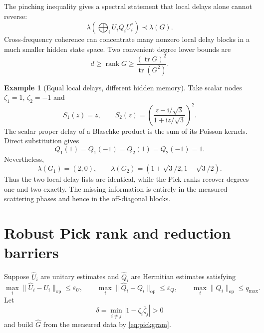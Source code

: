 \documentclass[11pt]{article}
\theoremstyle{definition}
\newtheorem{example}[theorem]{Example}
\theoremstyle{remark}
\newcommand{\tr}{\operatorname{tr}}
\newcommand{\rank}{\operatorname{rank}}
\newcommand{\opnorm}[1]{\lVert#1\rVert_{\mathrm{op}}}
\begin{document}
The pinching inequality gives a spectral statement that local delays alone
cannot reverse:
\begin{equation}\label{eq:pinching}
 \lambda\!\left(\bigoplus_iU_iQ_iU_i^*\right)
 \prec\lambda(G).
\end{equation}
Cross-frequency coherence can concentrate many nonzero local delay blocks in
a much smaller hidden state space.  Two convenient degree lower bounds are
\begin{equation}\label{eq:effectiverank}
 d\geq\rank G
 \geq\frac{(\tr G)^2}{\tr(G^2)}.
\end{equation}

\begin{example}[Equal local delays, different hidden memory]\label{ex:blindness}
Take scalar nodes $\zeta_1=1$, $\zeta_2=-1$ and
\begin{equation}\label{eq:blindfunctions}
 S_1(z)=z,
 \qquad
 S_2(z)=\left(\frac{z-\mathrm i/\sqrt3}{1+\mathrm iz/\sqrt3}\right)^2.
\end{equation}
The scalar proper delay of a Blaschke product is the sum of its Poisson
kernels.  Direct substitution gives
\begin{equation}\label{eq:samedelays}
 Q_1(1)=Q_1(-1)=Q_2(1)=Q_2(-1)=1.
\end{equation}
Nevertheless,
\begin{equation}\label{eq:strictpick}
 \lambda(G_1)=(2,0),
 \qquad
 \lambda(G_2)=(1+\sqrt3/2,1-\sqrt3/2).
\end{equation}
Thus the two local delay lists are identical, while the Pick ranks recover
degrees one and two exactly.  The missing information is entirely in the
measured scattering phases and hence in the off-diagonal blocks.
\end{example}

\section{Robust Pick rank and reduction barriers}

Suppose $\widehat U_i$ are unitary estimates and $\widehat Q_i$ are Hermitian
estimates satisfying
\begin{equation}\label{eq:pickerrors}
 \max_i\opnorm{\widehat U_i-U_i}\leq\varepsilon_U,
 \qquad
 \max_i\opnorm{\widehat Q_i-Q_i}\leq\varepsilon_Q,
 \qquad
 \max_i\opnorm{Q_i}\leq q_{\max}.
\end{equation}
Let
\begin{equation}\label{eq:nodeseparation}
 \delta=\min_{i\ne j}|1-\zeta_i\bar\zeta_j|>0
\end{equation}
and build $\widehat G$ from the measured data by \eqref{eq:pickgram}.
\end{document}
